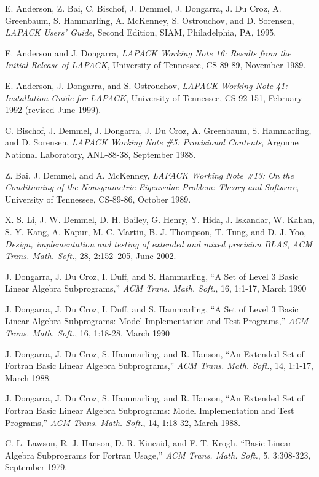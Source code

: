 \documentclass[11pt]{report}
\begin{document}
\newpage
{}

\begin{thebibliography}{9}

E. Anderson, Z. Bai, C. Bischof, J. Demmel, J. Dongarra,
J. Du Croz, A. Greenbaum, S. Hammarling, A. McKenney,
S. Ostrouchov, and D. Sorensen, 
\textit{LAPACK Users' Guide}, Second Edition,
{SIAM}, Philadelphia, PA, 1995.

E. Anderson and J. Dongarra,
\textit{LAPACK Working Note 16: 
Results from the Initial Release of LAPACK},
University of Tennessee, CS-89-89, November 1989.

E. Anderson, J. Dongarra, and S. Ostrouchov,
\textit{LAPACK Working Note 41: 
Installation Guide for LAPACK},
University of Tennessee, CS-92-151, February 1992 (revised June 1999).

C. Bischof, J. Demmel, J. Dongarra, J. Du Croz, A. Greenbaum,
S. Hammarling, and D. Sorensen,
\textit{LAPACK Working Note \#5:  Provisional Contents},
Argonne National Laboratory, ANL-88-38, September 1988.

Z. Bai, J. Demmel, and A. McKenney,
\textit{LAPACK Working Note \#13: On the Conditioning of the Nonsymmetric
Eigenvalue Problem:  Theory and Software}, 
University of Tennessee, CS-89-86, October 1989.

X. S. Li, J. W. Demmel, D. H. Bailey, G. Henry, Y. Hida, J. Iskandar,
W. Kahan, S. Y. Kang, A. Kapur, M. C. Martin, B. J. Thompson, T. Tung,
and D. J. Yoo, \textit{Design, implementation and testing of extended
  and mixed precision BLAS},
\textit{ACM Trans. Math. Soft.}, 28, 2:152--205, June 2002.
 
J. Dongarra, J. Du Croz, I. Duff, and S. Hammarling,
``A Set of Level 3 Basic Linear Algebra Subprograms,''
\textit{ACM Trans. Math. Soft.}, 16, 1:1-17, March 1990

J. Dongarra, J. Du Croz, I. Duff, and S. Hammarling,
``A Set of Level 3 Basic Linear Algebra Subprograms:
Model Implementation and Test Programs,''
\textit{ACM Trans. Math. Soft.}, 16, 1:18-28, March 1990

J. Dongarra, J. Du Croz, S. Hammarling, and R. Hanson,
``An Extended Set of Fortran Basic Linear Algebra Subprograms,''
\textit{ACM Trans. Math. Soft.}, 14, 1:1-17, March 1988.

J. Dongarra, J. Du Croz, S. Hammarling, and R. Hanson,
``An Extended Set of Fortran Basic Linear Algebra Subprograms:
Model Implementation and Test Programs,''
\textit{ACM Trans. Math. Soft.}, 14, 1:18-32, March 1988.

C. L. Lawson, R. J. Hanson, D. R. Kincaid, and F. T. Krogh,
``Basic Linear Algebra Subprograms for Fortran Usage,''
\textit{ACM Trans. Math. Soft.}, 5, 3:308-323, September 1979.

\end{thebibliography}
\end{document}
